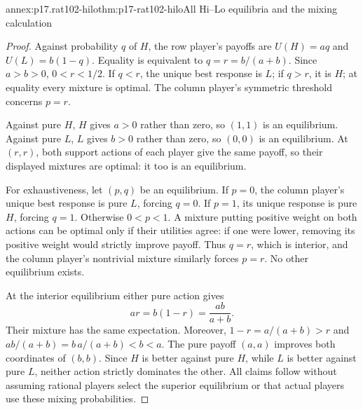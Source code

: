 \begin{annexitem}{annex:p17.rat102-hilo}{thm:p17-rat102-hilo}{All Hi--Lo equilibria and the mixing calculation}
\begin{proof}
Against probability \(q\) of \(H\), the row player's payoffs are
\(U(H)=aq\) and \(U(L)=b(1-q)\). Equality is equivalent to
\(q=r=b/(a+b)\). Since \(a>b>0\), \(0<r<1/2\).
If \(q<r\), the unique best response is \(L\); if \(q>r\), it is
\(H\); at equality every mixture is optimal. The column player's
symmetric threshold concerns \(p=r\).

Against pure \(H\), \(H\) gives \(a>0\) rather than zero, so
\((1,1)\) is an equilibrium. Against pure \(L\), \(L\) gives
\(b>0\) rather than zero, so \((0,0)\) is an equilibrium. At
\((r,r)\), both support actions of each player give the same payoff,
so their displayed mixtures are optimal: it too is an equilibrium.

For exhaustiveness, let \((p,q)\) be an equilibrium. If \(p=0\),
the column player's unique best response is pure \(L\), forcing
\(q=0\). If \(p=1\), its unique response is pure \(H\), forcing
\(q=1\). Otherwise \(0<p<1\). A mixture putting positive weight
on both actions can be optimal only if their utilities agree: if one were
lower, removing its positive weight would strictly improve payoff.
Thus \(q=r\), which is interior, and the column player's nontrivial
mixture similarly forces \(p=r\). No other equilibrium exists.

At the interior equilibrium either pure action gives
\[
                        ar=b(1-r)=\frac{ab}{a+b}.
\]
Their mixture has the same expectation. Moreover,
\(1-r=a/(a+b)>r\) and \(ab/(a+b)=b\,a/(a+b)<b<a\).
The pure payoff \((a,a)\) improves both coordinates of \((b,b)\).
Since \(H\) is better against pure \(H\), while \(L\) is better
against pure \(L\), neither action strictly dominates the other.
All claims follow without assuming rational players select the superior
equilibrium or that actual players use these mixing probabilities.
\end{proof}
\end{annexitem}

